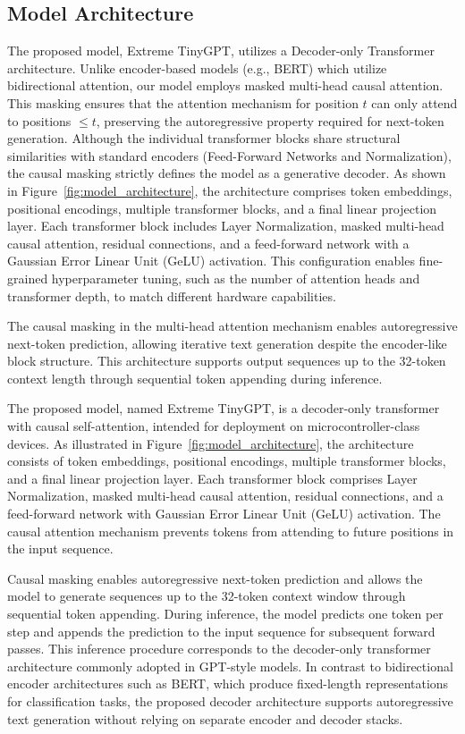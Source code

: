 \documentclass{ieeeaccess}
\begin{document}
\subsection{Model Architecture}

The proposed model, Extreme TinyGPT, utilizes a Decoder-only Transformer architecture. Unlike encoder-based models (e.g., BERT) which utilize bidirectional attention, our model employs masked multi-head causal attention. This masking ensures that the attention mechanism for position $t$ can only attend to positions $\le t$, preserving the autoregressive property required for next-token generation. Although the individual transformer blocks share structural similarities with standard encoders (Feed-Forward Networks and Normalization), the causal masking strictly defines the model as a generative decoder. As shown in Figure~\ref{fig:model_architecture}, the architecture comprises token embeddings, positional encodings, multiple transformer blocks, and a final linear projection layer. Each transformer block includes Layer Normalization, masked multi-head causal attention, residual connections, and a feed-forward network with a Gaussian Error Linear Unit (GeLU) activation. This configuration enables fine-grained hyperparameter tuning, such as the number of attention heads and transformer depth, to match different hardware capabilities.


The causal masking in the multi-head attention mechanism enables autoregressive next-token prediction, allowing iterative text generation despite the encoder-like block structure. This architecture supports output sequences up to the 32-token context length through sequential token appending during inference.




The proposed model, named Extreme TinyGPT, is a decoder-only transformer with causal self-attention, intended for deployment on microcontroller-class devices. As illustrated in Figure~\ref{fig:model_architecture}, the architecture consists of token embeddings, positional encodings, multiple transformer blocks, and a final linear projection layer. Each transformer block comprises Layer Normalization, masked multi-head causal attention, residual connections, and a feed-forward network with Gaussian Error Linear Unit (GeLU) activation. The causal attention mechanism prevents tokens from attending to future positions in the input sequence.


Causal masking enables autoregressive next-token prediction and allows the model to generate sequences up to the 32-token context window through sequential token appending. During inference, the model predicts one token per step and appends the prediction to the input sequence for subsequent forward passes. This inference procedure corresponds to the decoder-only transformer architecture commonly adopted in GPT-style models. In contrast to bidirectional encoder architectures such as BERT, which produce fixed-length representations for classification tasks, the proposed decoder architecture supports autoregressive text generation without relying on separate encoder and decoder stacks.
\end{document}
